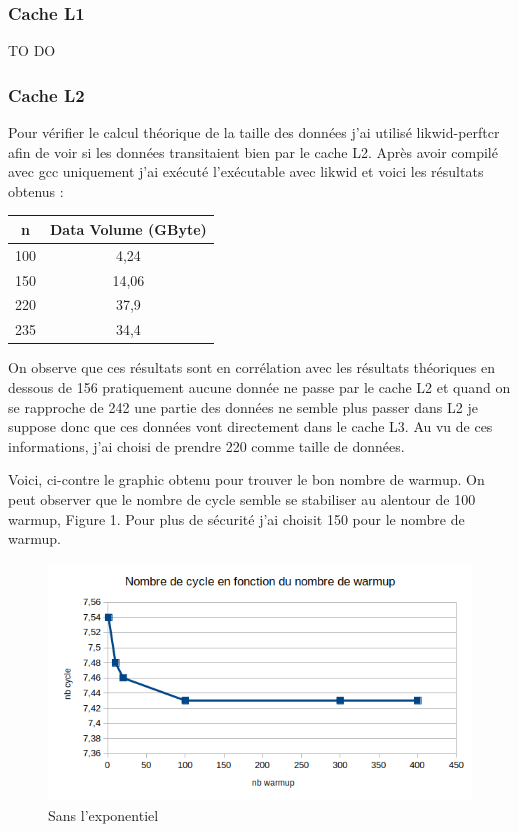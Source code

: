 \documentclass[12pt,a4paper]{article}
\begin{document}
\subsubsection{Cache L1}
TO DO

\subsubsection{Cache L2}
Pour vérifier le calcul théorique de la taille des données j'ai utilisé 
likwid-perftcr afin de voir si les données transitaient bien par le cache L2. 
Après avoir compilé avec gcc uniquement j'ai exécuté l'exécutable avec likwid 
et voici les résultats obtenus :
\newline

\begin{tabular}{|c|c|}
  \hline
  n & Data Volume (GByte) \\
  \hline
  100 & 4,24 \\
  \hline
  150 & 14,06 \\
  \hline
  220 & 37,9 \\
  \hline
  235 & 34,4 \\
  \hline
\end{tabular}

On observe que ces résultats sont en corrélation avec les résultats théoriques
en dessous de 156 pratiquement aucune donnée ne passe par le cache L2 et 
quand on se rapproche de 242 une partie des données ne semble plus passer 
dans L2 je suppose donc que ces données vont directement dans le cache L3.
Au vu de ces informations, j'ai choisi de prendre 220 comme taille de 
données.

\newline
Voici, ci-contre le graphic obtenu pour trouver le bon nombre de warmup. 
On peut observer que le nombre de cycle semble se stabiliser au alentour 
de 100 warmup, Figure 1. Pour plus de sécurité j'ai choisit 150 pour le nombre de 
warmup.

\begin{figure}
    \includegraphics[scale=0.8]{figures/L2/L2warmup.png}
    \caption{Sans l'exponentiel}
\end{figure}
\end{document}
